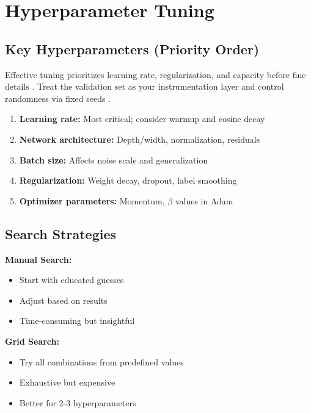 
\section{Hyperparameter Tuning}
\label{sec:hyperparameter-tuning}

\subsection{Key Hyperparameters (Priority Order)}

Effective tuning prioritizes learning rate, regularization, and capacity before fine details . Treat the validation set as your instrumentation layer and control randomness via fixed seeds \textcite{GoodfellowEtAl2016,Prince2023,D2LChapterOptimization}.

\begin{enumerate}
    \item \textbf{Learning rate:} Most critical; consider warmup and cosine decay
    \item \textbf{Network architecture:} Depth/width, normalization, residuals
    \item \textbf{Batch size:} Affects noise scale and generalization
    \item \textbf{Regularization:} Weight decay, dropout, label smoothing
    \item \textbf{Optimizer parameters:} Momentum, $\beta$ values in Adam
\end{enumerate}

\subsection{Search Strategies}

\textbf{Manual Search:}
\begin{itemize}
    \item Start with educated guesses
    \item Adjust based on results
    \item Time-consuming but insightful
\end{itemize}

\textbf{Grid Search:}
\begin{itemize}
    \item Try all combinations from predefined values
    \item Exhaustive but expensive
    \item Better for 2-3 hyperparameters
\end{itemize}

